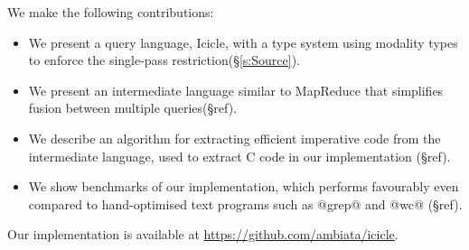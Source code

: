 We make the following contributions:
\begin{itemize}
\item 
We present a query language, Icicle, with a type system using modality types to enforce the single-pass restriction(\S\ref{s:Source}).
\item
We present an intermediate language similar to MapReduce that simplifies fusion between multiple queries(\S ref).
\item
We describe an algorithm for extracting efficient imperative code from the intermediate language, used to extract C code in our implementation (\S ref).
\item
We show benchmarks of our implementation, which performs favourably even compared to hand-optimised text programs such as @grep@ and @wc@ (\S ref).
\end{itemize}

Our implementation is available at \url{https://github.com/ambiata/icicle}.

